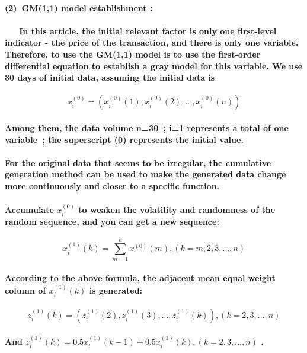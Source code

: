 \documentclass{mcmthesis}
\begin{document}
	\paragraph{(2)\ GM(1,1) model establishment :}
	\paragraph{\ \ \ In this article, the initial relevant factor is only one first-level indicator - the price of the transaction, and there is only one variable. Therefore, to use the GM(1,1) model is to use the first-order differential equation to establish a gray model for this variable. We use 30 days of initial data, assuming the initial data is }
	\begin{equation}
		x^{(0)}_{i} = (x^{(0)}_{i}(1),x^{(0)}_{i}(2),...,x^{(0)}_{i}(n))
	\end{equation}
	\paragraph{Among them, the data volume n=30\ ; i=1 represents a total of one variable\ ; the superscript (0) represents the initial value. }
	\paragraph{For the original data that seems to be irregular, the cumulative generation method can be used to make the generated data change more continuously and closer to a specific function. }
	\paragraph{Accumulate $x^{(0)}_{i}$ to weaken the volatility and randomness of the random sequence, and you can get a new sequence: }
	\begin{equation}
		x^{(1)}_{i}(k) = \sum_{m=1}^{n} x^{(0)}(m) ,(k=m,2,3,...,n)
	\end{equation}
	\paragraph{According to the above formula, the adjacent mean equal weight column of $x^{(1)}_{i}(k)$ is generated: }
	\begin{equation}
		z^{(1)}_{i}(k) = (z^{(1)}_{i}(2),z^{(1)}_{i}(3),...,z^{(1)}_{i}(k)),(k=2,3,...,n)
	\end{equation}
	\paragraph{And $z^{(1)}_{i}(k)=0.5x^{(1)}_{i}(k-1) +0.5x^{(1)}_{i}(k) , (k=2,3,...,n)$ . }
\end{document}
